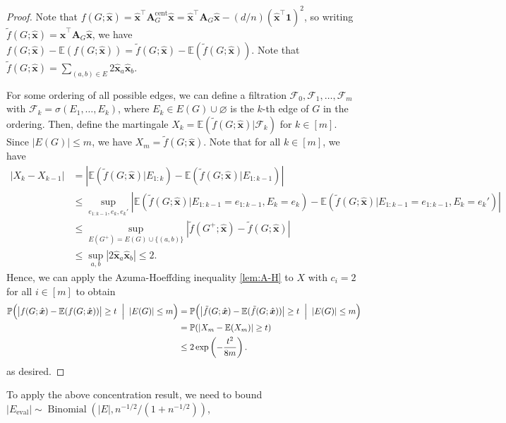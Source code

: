 \documentclass[11pt, titlepage]{article} %
\numberwithin{equation}{section}
\theoremstyle{definition}
\numberwithin{theorem}{section}
\numberwithin{lemma}{section}
\numberwithin{corollary}{section}
\numberwithin{proposition}{section}
\numberwithin{definition}{section}
\numberwithin{remark}{section}
\begin{document}
\begin{proof}
Note that $f(G; \hat{\bm{x}}) = \hat{\bm{x}}^\top \bm{A}_{G}^{\mathrm{cent}} \hat{\bm{x}}
= \hat{\bm{x}}^\top \bm{A}_{G} \hat{\bm{x}} - (d/n) (\hat{\bm{x}}^\top \bm{1})^2$,
so writing $\tilde{f}(G; \hat{\bm{x}}) = \hat{\bm{x}}^\top \bm{A}_{G} \hat{\bm{x}}$,
we have $f(G; \hat{\bm{x}}) - \mathbb{E}(f(G; \hat{\bm{x}})) = \tilde{f}(G; \hat{\bm{x}}) - \mathbb{E}(\tilde{f}(G; \hat{\bm{x}}))$.
Note that $\tilde{f}(G; \hat{\bm{x}}) = \sum_{(a,b) \in E} 2\hat{\bm{x}}_a \hat{\bm{x}}_b$.

For some ordering of all possible edges, we can define a filtration $\mathcal{F}_0, \mathcal{F}_1, \ldots, \mathcal{F}_m$
with $\mathcal{F}_k = \sigma(E_1, \ldots, E_k)$, where $E_k \in E(G) \cup \varnothing$ is the $k$-th edge of $G$ in the ordering. 
Then, define the martingale $X_k = \mathbb{E}(\tilde{f}(G; \hat{\bm{x}}) | \mathcal{F}_k)$ for $k \in [m]$. 
Since $|E(G)| \leq m$, we have $X_m = \tilde{f}(G; \hat{\bm{x}})$. Note that for all $k \in [m]$, we have
\begin{align*}
|X_k - X_{k-1}| &= \left|\mathbb{E}(\tilde{f}(G; \hat{\bm{x}}) | E_{1:k}) - \mathbb{E}(\tilde{f}(G; \hat{\bm{x}}) | E_{1:k-1})\right|\\
& \leq \sup_{e_{1:k-1}, e_k, e_k'} \left|\mathbb{E}(\tilde{f}(G; \hat{\bm{x}}) | E_{1:k-1} = e_{1:k-1}, E_k = e_k) 
- \mathbb{E}(\tilde{f}(G; \hat{\bm{x}}) | E_{1:k-1} = e_{1:k-1}, E_k = e_k')\right|\\
& \leq \sup_{E(G^+) = E(G) \cup \{(a,b)\}} \left|\tilde{f}(G^+; \hat{\bm{x}}) - \tilde{f}(G; \hat{\bm{x}})\right|\\
& \leq \sup_{a,b} |2\hat{\bm{x}}_a \hat{\bm{x}}_b| \leq 2.
\end{align*}
Hence, we can apply the Azuma-Hoeffding inequality \cref{lem:A-H} to $X$ with $c_i = 2$ for all $i \in [m]$ to obtain
\begin{align*}
\mathbb{P}\Bigl(
    \bigl|f(G; \hat{\bm{x}})-\mathbb{E}(f(G; \hat{\bm{x}}))\bigr|
    \ge t
    \;\Bigm|\;
    |E(G)| \le m
\Bigr)
&= \mathbb{P}\Bigl(
    \bigl|\tilde{f}(G; \hat{\bm{x}})-\mathbb{E}(\tilde{f}(G; \hat{\bm{x}}))\bigr|
    \ge t
    \;\Bigm|\;
    |E(G)| \le m
\Bigr)\\
&= \mathbb{P}(|X_m - \mathbb{E}(X_m)| \geq t)\\
&\leq 2\exp\left(-\frac{t^2}{8m}\right).
\end{align*}
as desired.
\end{proof}
To apply the above concentration result, we need to bound 
$|E_\mathrm{eval}| \sim \operatorname{Binomial}\left(|E|, n^{-1/2}/(1 + n^{-1/2})\right)$,
\end{document}
